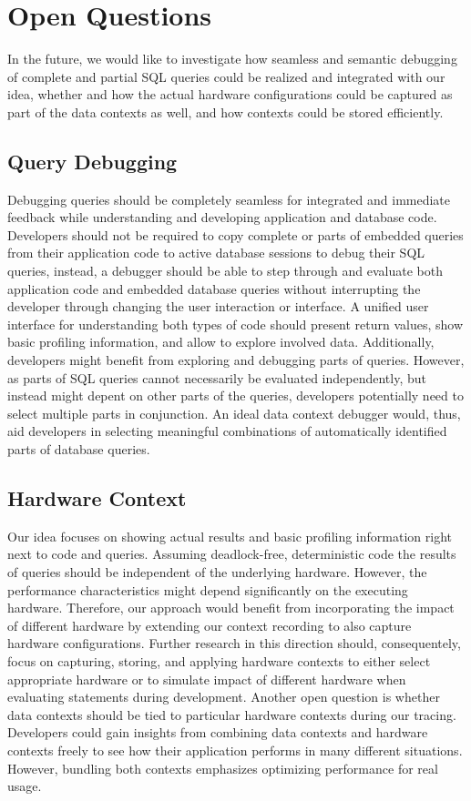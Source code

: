 \section{Open Questions} \label{sec:OPEN_QUESTIONS}
In the future, we would like to investigate how seamless and semantic debugging of complete and partial SQL queries could be realized and integrated with our idea, whether and how the actual hardware configurations could be captured as part of the data contexts as well, and how contexts could be stored efficiently.

\subsection{Query Debugging}
Debugging queries should be completely seamless for integrated and immediate feedback while understanding and developing application and database code.
Developers should not be required to copy complete or parts of embedded queries from their application code to active database sessions to debug their SQL queries, instead, a debugger should be able to step through and evaluate both application code and embedded database queries without interrupting the developer through changing the user interaction or interface.
A unified user interface for understanding both types of code should present return values, show basic profiling information, and allow to explore involved data.
Additionally, developers might benefit from exploring and debugging parts of queries.
However, as parts of SQL queries cannot necessarily be evaluated independently, but instead might depent on other parts of the queries, developers potentially need to select multiple parts in conjunction. 
An ideal data context debugger would, thus, aid developers in selecting meaningful combinations of automatically identified parts of database queries.

\subsection{Hardware Context}
Our idea focuses on showing actual results and basic profiling information right next to code and queries.
Assuming deadlock-free, deterministic code the results of queries should be independent of the underlying hardware.
However, the performance characteristics might depend significantly on the executing hardware.
Therefore, our approach would benefit from incorporating the impact of different hardware by extending our context recording to also capture hardware configurations.
Further research in this direction should, consequentely, focus on capturing, storing, and applying hardware contexts to either select appropriate hardware  or to simulate impact of different hardware when evaluating statements during development.
Another open question is whether data contexts should be tied to particular hardware contexts during our tracing.
Developers could gain insights from combining data contexts and hardware contexts freely to see how their application performs in many different situations.
However, bundling both contexts emphasizes optimizing performance for real usage.

